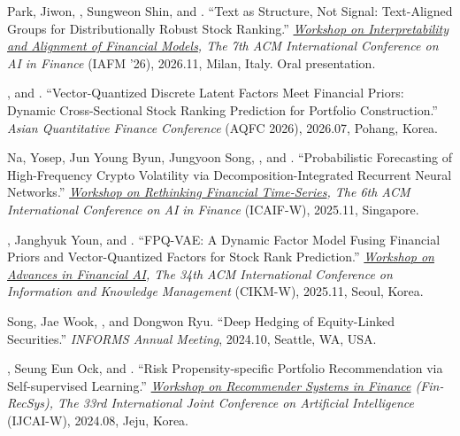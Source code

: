 \documentclass[11pt]{article}
\begin{document}
\begin{nlist}
\item[{[6]}] Park, Jiwon\cvmark{\textdagger}, \me\cvmark{\textdagger}, Sungweon Shin, and \song. ``Text as Structure, Not Signal: Text-Aligned Groups for Distributionally Robust Stock Ranking.'' \textit{\href{https://iafm-icaif.netlify.app/}{Workshop on Interpretability and Alignment of Financial Models}, The 7th ACM International Conference on AI in Finance} (IAFM '26), 2026.11, Milan, Italy. Oral presentation.
\item[{[5]}] \mefirst, and \song. ``Vector-Quantized Discrete Latent Factors Meet Financial Priors: Dynamic Cross-Sectional Stock Ranking Prediction for Portfolio Construction.'' \textit{Asian Quantitative Finance Conference} (AQFC 2026), 2026.07, Pohang, Korea.
\item[{[4]}] Na, Yosep, Jun Young Byun, Jungyoon Song, \me, and \song. ``Probabilistic Forecasting of High-Frequency Crypto Volatility via Decomposition-Integrated Recurrent Neural Networks.'' \textit{\href{https://icaif25-rfts.github.io/}{Workshop on Rethinking Financial Time-Series}, The 6th ACM International Conference on AI in Finance} (ICAIF-W), 2025.11, Singapore.
\item[{[3]}] \mefirst, Janghyuk Youn, and \song. ``FPQ-VAE: A Dynamic Factor Model Fusing Financial Priors and Vector-Quantized Factors for Stock Rank Prediction.'' \textit{\href{https://advancesinfinancialai.com/}{Workshop on Advances in Financial AI}, The 34th ACM International Conference on Information and Knowledge Management} (CIKM-W), 2025.11, Seoul, Korea.
\item[{[2]}] Song, Jae Wook\cvmark{*}, \me, and Dongwon Ryu. ``Deep Hedging of Equity-Linked Securities.'' \textit{INFORMS Annual Meeting}, 2024.10, Seattle, WA, USA.
\item[{[1]}] \mefirst, Seung Eun Ock, and \song. ``Risk Propensity-specific Portfolio Recommendation via Self-supervised Learning.'' \textit{\href{https://sites.google.com/view/fin-recsys2024/program}{Workshop on Recommender Systems in Finance} (Fin-RecSys), The 33rd International Joint Conference on Artificial Intelligence} (IJCAI-W), 2024.08, Jeju, Korea.
\end{nlist}
\end{document}
